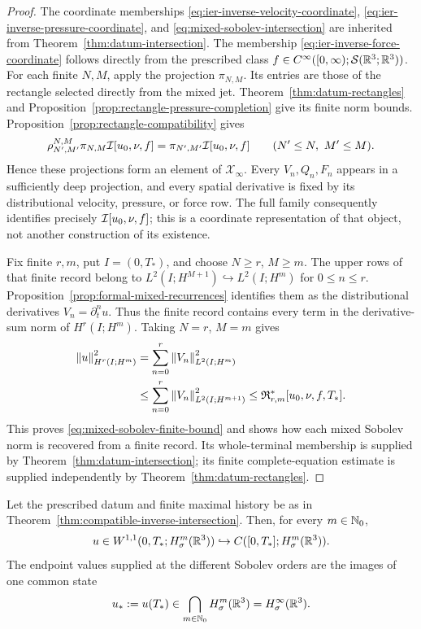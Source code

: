 \begin{proof}
The coordinate memberships
\eqref{eq:ier-inverse-velocity-coordinate},
\eqref{eq:ier-inverse-pressure-coordinate}, and
\eqref{eq:mixed-sobolev-intersection} are inherited from
Theorem~\ref{thm:datum-intersection}.
The membership \eqref{eq:ier-inverse-force-coordinate} follows directly from
the prescribed class
\(f\in C^\infty([0,\infty);\mathcal S(\mathbb R^3;\mathbb R^3))\).
For each finite \(N,M\), apply the projection \(\pi_{N,M}\).
Its entries are those of the rectangle selected directly from the mixed
jet.
Theorem~\ref{thm:datum-rectangles} and
Proposition~\ref{prop:rectangle-pressure-completion} give its finite norm
bounds.  Proposition~\ref{prop:rectangle-compatibility} gives
\[
 \rho_{N',M'}^{N,M}\pi_{N,M}\mathcal I[u_0,\nu,f]
 =\pi_{N',M'}\mathcal I[u_0,\nu,f]
 \qquad(N'\le N,\ M'\le M).
\]
Hence these projections form an element of \(\mathscr X_\infty\).
Every \(V_n,Q_n,F_n\) appears in a sufficiently deep projection, and every
spatial derivative is fixed by its distributional velocity, pressure, or force
row.  The full family consequently identifies precisely
\(\mathcal I[u_0,\nu,f]\); this is a coordinate representation of that object, not
another construction of its existence.

Fix finite \(r,m\), put \(I=(0,T_*)\), and choose \(N\ge r\),
\(M\ge m\). The upper rows of that finite record belong to
\(L^2(I;H^{M+1})\hookrightarrow L^2(I;H^m)\) for \(0\le n\le r\).
Proposition~\ref{prop:formal-mixed-recurrences} identifies them as the
distributional derivatives \(V_n=\partial_t^nu\). Thus the finite record
contains every term in the derivative-sum norm of \(H^r(I;H^m)\).
Taking \(N=r\), \(M=m\) gives
\[
 \begin{aligned}
 \left\lVert u\right\rVert_{H^r(I;H^m)}^2
 &=\sum_{n=0}^r\left\lVert V_n\right\rVert_{L^2(I;H^m)}^2\\
 &\le\sum_{n=0}^r\left\lVert V_n\right\rVert_{L^2(I;H^{m+1})}^2
 \le\mathfrak R_{r,m}^*[u_0,\nu,f,T_*].
 \end{aligned}
\]
This proves \eqref{eq:mixed-sobolev-finite-bound} and shows how each
mixed Sobolev norm is recovered from a finite record.  Its whole-terminal
membership is supplied by Theorem~\ref{thm:datum-intersection}; its finite
complete-equation estimate is supplied independently by
Theorem~\ref{thm:datum-rectangles}.
\end{proof}

\begin{proposition}
\label{prop:ier-complete-spatial-endpoint}
Let the prescribed datum and finite maximal history be as in
Theorem~\ref{thm:compatible-inverse-intersection}.  Then, for every
\(m\in\mathbb N_0\),
\begin{equation}
 u\in W^{1,1}(0,T_*;H^m_\sigma(\mathbb R^3))
 \hookrightarrow C([0,T_*];H^m_\sigma(\mathbb R^3)).
 \label{eq:ier-spatial-row-W11}
\end{equation}
The endpoint values supplied at the different Sobolev orders are the images
of one common state
\begin{equation}
 u_*:=u(T_*)\in\bigcap_{m\in\mathbb N_0}H^m_\sigma(\mathbb R^3)
 =H^\infty_\sigma(\mathbb R^3).
 \label{eq:ier-common-spatial-endpoint}
\end{equation}
\end{proposition}

